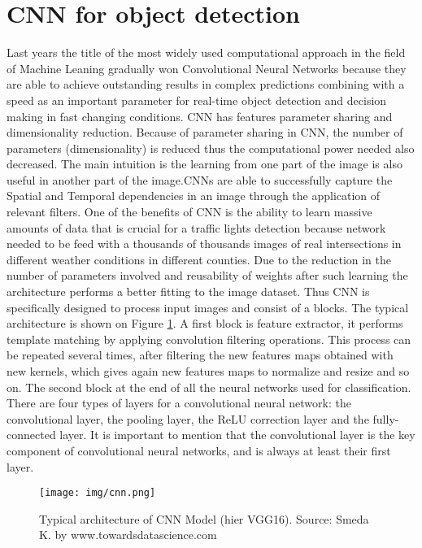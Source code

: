 \documentclass[letterpaper, 10 pt, conference]{ieeeconf} %
\begin{document}
\section{CNN for object detection}
Last years the title of the most widely used computational approach in the field of Machine Leaning gradually won Convolutional Neural Networks because they are able to achieve outstanding results in complex predictions combining with a speed as an important parameter for real-time object detection and decision making in fast changing conditions. CNN has features parameter sharing and dimensionality reduction. Because of parameter sharing in CNN, the number of parameters (dimensionality) is reduced thus the computational power needed also decreased. The main intuition is the learning from one part of the image is also useful in another part of the image.CNNs are able to successfully capture the Spatial and Temporal dependencies in an image through the application of relevant filters. One of the benefits of CNN is the ability to learn massive amounts of data that is crucial for a traffic lights detection because network needed to be feed with a thousands of thousands images of real intersections in different weather conditions in different counties. Due to the reduction in the number of parameters involved and reusability of weights after such learning the architecture performs a better fitting to the image dataset. Thus CNN is specifically designed to process input images and consist of a blocks. The typical architecture is shown on Figure \ref{cnn}. A first block is feature extractor,  it performs template matching by applying convolution filtering operations. This process can be repeated several times, after filtering the new features maps obtained with new kernels, which gives again new features maps to normalize and resize and so on. The second block at the end of all the neural networks used for classification. There are four types of layers for a convolutional neural network: the convolutional layer, the pooling layer, the ReLU correction layer and the fully-connected layer. It is important to mention that the convolutional layer is the key component of convolutional neural networks, and is always at least their first layer.

\begin{figure}[thpb]
	\centering
	\texttt{[image: img/cnn.png]}
	\caption{Typical architecture of CNN Model (hier VGG16). Source: Smeda K. by www.towardsdatascience.com} 
	\label{cnn}
\end{figure}
\end{document}
